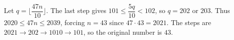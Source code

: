 Let $q=\lfloor\dfrac{47n}{10}\rfloor$. The last step gives $101\le\dfrac{5q}{10}<102$, so $q=202$ or $203$. Thus $2020\le47n\le2039$, forcing $n=43$ since $47\cdot43=2021$. The steps are $2021\to202\to1010\to101$, so the original number is $\boxed{43}$.
